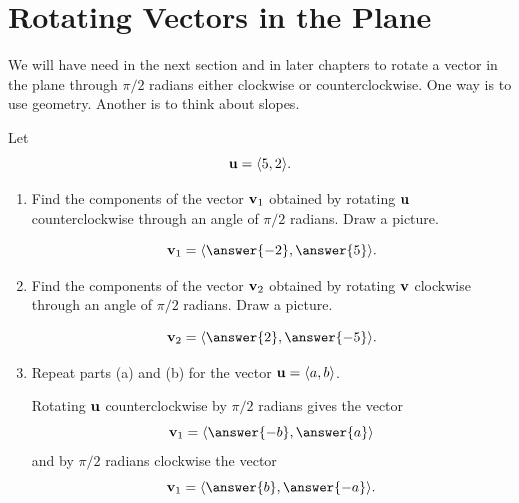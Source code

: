 \documentclass{ximera}
\begin{document}
\section{Rotating Vectors in the Plane}

We will have need in the next section and in later chapters to rotate a vector in the plane through $\pi/2$ radians either clockwise or counterclockwise. One way is to use geometry. Another is to think about slopes.

\begin{question} \label{Qodf3r3r}
Let 
\[
     {\bf u} = \langle 5, 2 \rangle.
\]
\begin{enumerate}
\item Find the components of the vector ${\bf v}_1$ obtained by rotating ${\bf u}$ counterclockwise through an angle of $\pi/2$ radians. Draw a picture.

\[
     {\bf v}_1 = \langle \answer{-2}, \answer{5} \rangle.             
\]    

\item Find the components of the vector ${\bf v}_2$ obtained by rotating ${\bf v}$ clockwise through an angle of $\pi/2$ radians. Draw a picture.

\[
     {\bf v}_2 = \langle \answer{2}, \answer{-5} \rangle.             
\]    

\item Repeat parts (a) and (b) for the vector ${\bf u} = \langle a,b \rangle$.

Rotating ${\bf u}$ counterclockwise by $\pi/2$ radians gives the vector
\[
    {\bf v}_1 = \langle \answer{-b} , \answer{a} \rangle
\]
and by $\pi/2$ radians clockwise the vector
\[
  {\bf v}_1 = \langle \answer{b} , \answer{-a} \rangle .
\]
\end{enumerate}
\end{question}
\end{document}
